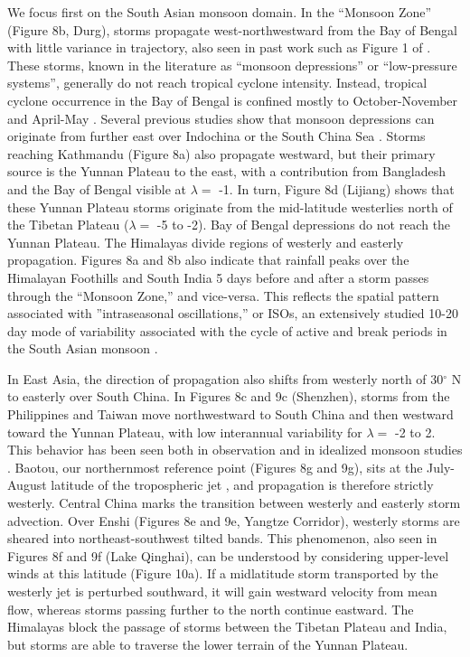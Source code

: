 	 We focus first on the South Asian monsoon domain. In the ``Monsoon Zone'' (Figure 8b, Durg), storms propagate west-northwestward from the Bay of Bengal with little variance in trajectory, also seen in past work such as Figure 1 of \cite{Sikka1977}. These storms, known in the literature as ``monsoon depressions'' or ``low-pressure systems''\parencite{Sikka1977,Chen1999,Krishnamurthy2010}, generally do not reach tropical cyclone intensity. Instead, tropical cyclone occurrence in the Bay of Bengal is confined mostly to October-November and April-May \parencite{Li2013}. Several previous studies show that monsoon depressions can originate from further east over Indochina or the South China Sea \parencite{Saha1981}. Storms reaching Kathmandu (Figure 8a) also propagate westward, but their primary source is the Yunnan Plateau to the east, with a contribution from Bangladesh and the Bay of Bengal visible at $\lambda =$ -1. In turn, Figure 8d (Lijiang) shows that these Yunnan Plateau storms originate from the mid-latitude westerlies north of the Tibetan Plateau ($\lambda =$ -5 to -2). Bay of Bengal depressions do not reach the Yunnan Plateau. The Himalayas divide regions of westerly and easterly propagation. Figures 8a and 8b also indicate that rainfall peaks over the Himalayan Foothills and South India 5 days before and after a storm passes through the ``Monsoon Zone,'' and vice-versa. This reflects the spatial pattern associated with ''intraseasonal oscillations,'' or ISOs, an extensively studied 10-20 day mode of variability associated with the cycle of active and break periods in the South Asian monsoon \parencite{Krishnamurti1980,Chen1993,Annamalai2001,Han2006,Fujinami2011,Fujinami2014}.
	 	 
	 In East Asia, the direction of propagation also shifts from westerly north of 30$^{\circ}$ N to easterly over South China. In Figures 8c and 9c (Shenzhen), storms from the Philippines and Taiwan move northwestward to South China and then westward toward the Yunnan Plateau, with low interannual variability for $\lambda =$ -2 to 2. This behavior has been seen both in observation \parencite{Chen1999,Liu2003} and in idealized monsoon studies \parencite{Prive2007a}. Baotou, our northernmost reference point (Figures 8g and 9g), sits at the July-August latitude of the tropospheric jet \parencite{Schiemann2009}, and propagation is therefore strictly westerly. Central China marks the transition between westerly and easterly storm advection. Over Enshi (Figures 8e and 9e, Yangtze Corridor), westerly storms are sheared into northeast-southwest tilted bands. This phenomenon, also seen in Figures 8f and 9f (Lake Qinghai), can be understood by considering upper-level winds at this latitude (Figure 10a). If a midlatitude storm transported by the westerly jet is perturbed southward, it will gain westward velocity from mean flow, whereas storms passing further to the north continue eastward. The Himalayas block the passage of storms between the Tibetan Plateau and India, but storms are able to traverse the lower terrain of the Yunnan Plateau.
	 
